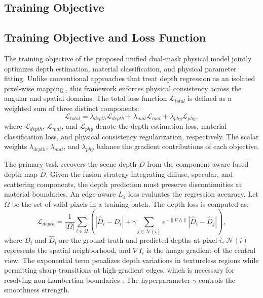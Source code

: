 \documentclass[lettersize,journal]{IEEEtran}
\begin{document}
\subsection{Training Objective}

\subsection{Training Objective and Loss Function}

The training objective of the proposed unified dual-mask physical model jointly optimizes depth estimation, material classification, and physical parameter fitting. Unlike conventional approaches that treat depth regression as an isolated pixel-wise mapping \cite{heber2018}, this framework enforces physical consistency across the angular and spatial domains. The total loss function $\mathcal{L}_{total}$ is defined as a weighted sum of three distinct components:
\begin{equation}
    \mathcal{L}_{total} = \lambda_{depth} \mathcal{L}_{depth} + \lambda_{mat} \mathcal{L}_{mat} + \lambda_{phy} \mathcal{L}_{phy},
\end{equation}
where $\mathcal{L}_{depth}$, $\mathcal{L}_{mat}$, and $\mathcal{L}_{phy}$ denote the depth estimation loss, material classification loss, and physical consistency regularization, respectively. The scalar weights $\lambda_{depth}$, $\lambda_{mat}$, and $\lambda_{phy}$ balance the gradient contributions of each objective.

The primary task recovers the scene depth $D$ from the component-aware fused depth map $\hat{D}$. Given the fusion strategy integrating diffuse, specular, and scattering components, the depth prediction must preserve discontinuities at material boundaries. An edge-aware $L_1$ loss evaluates the regression accuracy. Let $\Omega$ be the set of valid pixels in a training batch. The depth loss is computed as:
\begin{equation}
    \mathcal{L}_{depth} = \frac{1}{|\Omega|} \sum_{i \in \Omega} \left( |\hat{D}_i - D_i| + \gamma \sum_{j \in \mathcal{N}(i)} e^{-\|\nabla I_i\|} |\hat{D}_i - \hat{D}_j| \right),
\end{equation}
where $D_i$ and $\hat{D}_i$ are the ground-truth and predicted depths at pixel $i$, $\mathcal{N}(i)$ represents the spatial neighborhood, and $\nabla I_i$ is the image gradient of the central view. The exponential term penalizes depth variations in textureless regions while permitting sharp transitions at high-gradient edges, which is necessary for resolving non-Lambertian boundaries \cite{li2021}. The hyperparameter $\gamma$ controls the smoothness strength.
\end{document}
